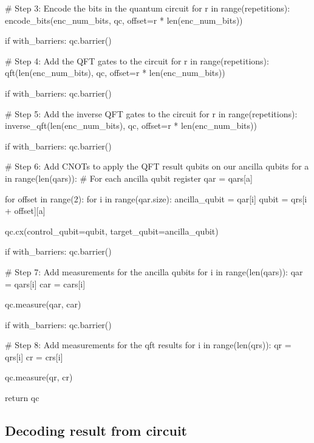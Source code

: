 \begin{python}
    # Step 3: Encode the bits in the quantum circuit
    for r in range(repetitions):
        encode_bits(enc_num_bits, qc, offset=r * len(enc_num_bits))

    if with_barriers:
        qc.barrier()

    # Step 4: Add the QFT gates to the circuit
    for r in range(repetitions):
        qft(len(enc_num_bits), qc, offset=r * len(enc_num_bits))

    if with_barriers:
        qc.barrier()

    # Step 5: Add the inverse QFT gates to the circuit
    for r in range(repetitions):
        inverse_qft(len(enc_num_bits), qc, offset=r * len(enc_num_bits))

    if with_barriers:
        qc.barrier()

    # Step 6: Add CNOTs to apply the QFT result qubits on our ancilla qubits
    for a in range(len(qars)): # For each ancilla qubit register
        qar = qars[a]

        for offset in range(2):
            for i in range(qar.size):
                ancilla_qubit = qar[i]
                qubit = qrs[i + offset][a]

                qc.cx(control_qubit=qubit, target_qubit=ancilla_qubit)

        if with_barriers:
            qc.barrier()

    # Step 7: Add measurements for the ancilla qubits
    for i in range(len(qars)):
        qar = qars[i]
        car = cars[i]

        qc.measure(qar, car)

    if with_barriers:
        qc.barrier()

    # Step 8: Add measurements for the qft results
    for i in range(len(qrs)):
        qr = qrs[i]
        cr = crs[i]

        qc.measure(qr, cr)

    return qc
\end{python}

\subsection{Decoding result from circuit}
\label{subsec:appendix-decoding-result-circuit}

